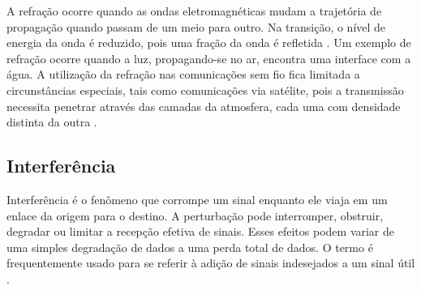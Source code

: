 A refração ocorre quando as ondas eletromagnéticas mudam a trajetória de propagação quando passam de um meio para outro. Na transição, o nível de energia da onda é reduzido, pois uma fração da onda é refletida \cite{flickenger2008}. Um exemplo de refração ocorre quando a luz, propagando-se no ar, encontra uma interface com a água. A utilização da refração nas comunicações sem fio fica limitada a circunstâncias especiais, tais como comunicações via satélite, pois a transmissão necessita penetrar através das camadas da atmosfera, cada uma com densidade distinta da outra \cite{rappaport2009}.
\begin{figure}[H]
	\centering
\end{figure}

\subsection{Interferência}
\label{sub:interferencia}

Interferência é o fenômeno que corrompe um sinal enquanto ele viaja em um enlace da origem para o destino. A perturbação pode interromper, obstruir, degradar ou limitar a recepção efetiva de sinais. Esses efeitos podem variar de uma simples degradação de dados a uma perda total de dados. O termo é frequentemente usado para se referir à adição de sinais indesejados a um sinal útil \cite{flickenger2008}.

